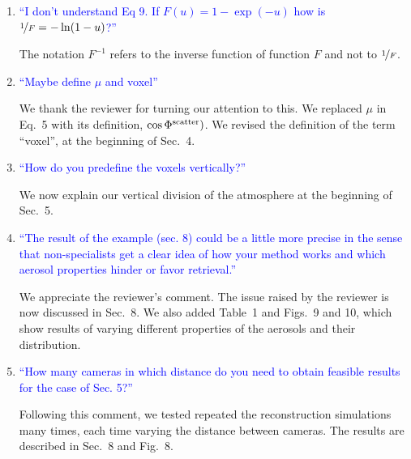 \documentclass[12pt]{article}
\begin{document}
\begin{enumerate}

\item \textcolor{blue}{``I don’t understand Eq 9. If $F(u) =
    1-\exp(-u)$ how is $\nicefrac{1}{F} = -\ln(1-u)$?''}

  {The notation $F^{-1}$ refers to the inverse function
   of function $F$ and not to $\nicefrac{1}{F}$.}

\item \textcolor{blue}{ ``Maybe define $\mu$ and voxel''}

  {We thank the reviewer for turning our attention to this.
   We replaced $\mu$ in Eq.~5 with its definition,
   $\cos \Phi^{\rm scatter})$. We revised the definition
   of the term ``voxel'', at the beginning of Sec.~4.}


\item \textcolor{blue}{ ``How do you predefine the voxels
    vertically?''}

  {
    We now explain our vertical division of the atmosphere at the
    beginning of Sec.~5.
  }


\item \textcolor{blue}{ ``The result of the example (sec. 8) could be
    a little more precise in the sense that non-specialists get a
    clear idea of how your method works and which aerosol properties
    hinder or favor retrieval.''}

  {
    We appreciate the reviewer's comment. The issue raised by the
    reviewer is now discussed in Sec.~8. We also added Table~1 and
    Figs.~9 and 10, which show results of varying different properties
    of the aerosols and their distribution.
  }


\item \textcolor{blue}{ ``How many cameras in which distance do you
    need to obtain feasible results for the case of Sec. 5?''}

  {Following this comment, we tested  repeated the reconstruction
   simulations many times, each time varying the distance between
   cameras. The results are described in Sec.~8 and Fig.~8.}

\end{enumerate}
\end{document}
